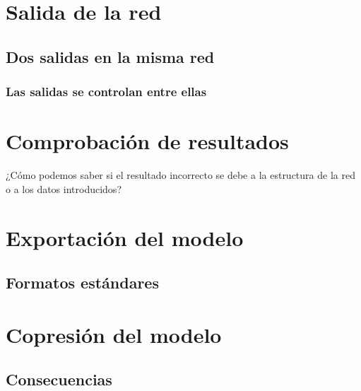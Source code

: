 
\section{Salida de la red}

\subsection{Dos salidas en la misma red}

\subsubsection{Las salidas se controlan entre ellas}


\section{Comprobación de resultados}

¿Cómo podemos saber si el resultado incorrecto se debe a la estructura de la red o a los datos introducidos?


\section{Exportación del modelo}

\subsection{Formatos estándares}

\subsubsection{}


\section{Copresión del modelo}

\subsection{Consecuencias}

